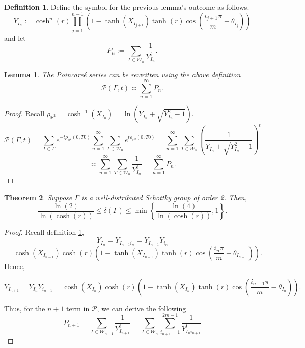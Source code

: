 \documentclass[12pt,oneside]{sfsuthesis}
\theoremstyle{plain} %
\newtheorem{theorem}{Theorem}[chapter]
\newtheorem{lemma}[theorem]{Lemma}
\theoremstyle{definition}  %
\newtheorem{definition}{Definition}[chapter]
\theoremstyle{remark}  %
\theoremstyle{plain}
\begin{document}
{\begin{definition}\label{PY}
Define the symbol for the previous lemma's outcome as follows.
$$
Y_{I_n}:=\cosh^n\left(r\right)\prod_{j=1}^{n-1}\left(1-\tanh\left(X_{I_{j+1}}\right)\tanh\left(r\right)\cos\left(\frac{i_{j+1}\pi}{m}-\theta_{I_j}\right)\right)
$$
and let
$$
P_n:=\sum_{T\in\mathcal{W}_n}\frac{1}{Y_{I_n}^t}.
$$
\end{definition}
\begin{lemma}
The Poincare\'{e} series can be rewritten using the above definition
$$
\mathcal{P}\left(\Gamma,t\right)\asymp \sum_{n=1}^\infty P_n.
$$
\end{lemma}
\begin{proof}
Recall $\rho_{\mathbb{B}^2}=\cosh^{-1}\left(X_{I_{n}}\right)= \ln\left(Y_{I_n}+\sqrt{Y_{I_n}^2-1}\right).$
$$
\mathcal{P}\left(\Gamma,t\right)=\sum_{T\in\Gamma}e^{-t\rho_{\mathbb{B}^2}\left(0,T0\right)}
\sum_{n=1}^\infty\sum_{T\in \mathcal{W}_n}e^{t\rho_{\mathbb{B}^2}\left(0,T0\right)}=\sum_{n=1}^\infty\sum_{T\in \mathcal{W}_n}\left(\frac{1}{Y_{I_n}+\sqrt{Y_{I_n}^2}-1} \right)^t
$$
$$
\asymp \sum_{n=1}^\infty\sum_{T\in \mathcal{W}_n}\frac{1}{Y_{I_n}^t}=\sum_{n=1}^\infty P_n.
$$
\end{proof}
\begin{theorem}
Suppose $\Gamma$ is a well-distributed Schottky group of order 2. Then, 
$$
\frac{\ln\left( 2\right)}{\ln\left(\cosh\left(r\right)\right)}\leq \delta\left(\Gamma\right)\leq
\min\left\lbrace \frac{\ln\left(4\right)}{\ln\left(\cosh\left(r\right)\right)},1\right\rbrace.
$$
\end{theorem}
\begin{proof}
Recall definition \ref{PY}, 
$$
Y_{I_n}=Y_{I_{n-1}i_n}=Y_{I_{n-1}} Y_{i_n}
$$
$$=\cosh\left(X_{I_{n-1}}\right)\cosh\left( r\right)\left( 1- \tanh\left(X_{I_{n-1}}\right)\tanh\left(r\right)\cos\left( \frac{i_n\pi}{m}-\theta_{I_{n-1}}\right)\right).
$$
Hence, 
\begin{small}
$$
Y_{I_{n+1}}=Y_{I_{n}} Y_{i_{n+1}}=\cosh\left(X_{I_{n}}\right)\cosh\left( r\right)\left( 1- \tanh\left(X_{I_{n}}\right)\tanh\left(r\right)\cos\left( \frac{i_{n+1}\pi}{m}-\theta_{I_{n}}\right)\right).
$$
\end{small}
Thus, for the $n+1$ term in $\mathcal{P}$, we can derive the following
$$
P_{n+1}=\sum_{T\in\mathcal{W}_{n+1}}\frac{1}{Y_{I_{n+1}}^t}=\sum_{T\in\mathcal{W}_n}\sum_{i_{n+1}=1}^{2m-1}\frac{1}{Y_{I_{n}i_{n+1}}^t}
$$



\end{proof}}
\end{document}
